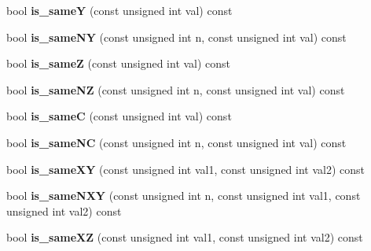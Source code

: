 \begin{DoxyCompactItemize}
\item 
\hypertarget{structcimg__library_1_1CImgList_a270d026b782560acbd5ba92488605cca}{
bool {\bfseries is\_\-sameY} (const unsigned int val) const }
\label{structcimg__library_1_1CImgList_a270d026b782560acbd5ba92488605cca}

\item 
\hypertarget{structcimg__library_1_1CImgList_ac260412703e5e3931102c5d781b9ab76}{
bool {\bfseries is\_\-sameNY} (const unsigned int n, const unsigned int val) const }
\label{structcimg__library_1_1CImgList_ac260412703e5e3931102c5d781b9ab76}

\item 
\hypertarget{structcimg__library_1_1CImgList_af0066f294d82d878cc672536c99165d1}{
bool {\bfseries is\_\-sameZ} (const unsigned int val) const }
\label{structcimg__library_1_1CImgList_af0066f294d82d878cc672536c99165d1}

\item 
\hypertarget{structcimg__library_1_1CImgList_a8a027c6c21372e08b6195b00b0186f84}{
bool {\bfseries is\_\-sameNZ} (const unsigned int n, const unsigned int val) const }
\label{structcimg__library_1_1CImgList_a8a027c6c21372e08b6195b00b0186f84}

\item 
\hypertarget{structcimg__library_1_1CImgList_a51537a703a9b012ee9b577dbd2c2f7db}{
bool {\bfseries is\_\-sameC} (const unsigned int val) const }
\label{structcimg__library_1_1CImgList_a51537a703a9b012ee9b577dbd2c2f7db}

\item 
\hypertarget{structcimg__library_1_1CImgList_a1d7b315261b036d75051dd27f1d7c3f8}{
bool {\bfseries is\_\-sameNC} (const unsigned int n, const unsigned int val) const }
\label{structcimg__library_1_1CImgList_a1d7b315261b036d75051dd27f1d7c3f8}

\item 
\hypertarget{structcimg__library_1_1CImgList_a7a3e0663947a6bafb1285b161c4b5408}{
bool {\bfseries is\_\-sameXY} (const unsigned int val1, const unsigned int val2) const }
\label{structcimg__library_1_1CImgList_a7a3e0663947a6bafb1285b161c4b5408}

\item 
\hypertarget{structcimg__library_1_1CImgList_a1b43bc7dbea2784f295d7d0dc3d5166b}{
bool {\bfseries is\_\-sameNXY} (const unsigned int n, const unsigned int val1, const unsigned int val2) const }
\label{structcimg__library_1_1CImgList_a1b43bc7dbea2784f295d7d0dc3d5166b}

\item 
\hypertarget{structcimg__library_1_1CImgList_a35f92cc77e698ce82dec90db3b39e5ff}{
bool {\bfseries is\_\-sameXZ} (const unsigned int val1, const unsigned int val2) const }
\label{structcimg__library_1_1CImgList_a35f92cc77e698ce82dec90db3b39e5ff}


\end{DoxyCompactItemize}
